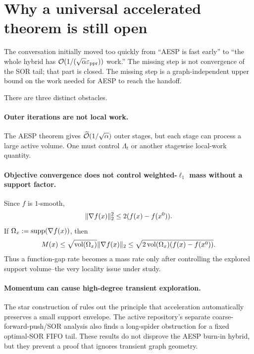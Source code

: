 \section{Why a universal accelerated theorem is still open}
\label{sec:open-gap}

The conversation initially moved too quickly from ``AESP is fast early'' to
``the whole hybrid has $\mathcal{O}(1/(\sqrt\alpha\varepsilon_{\mathrm{ppr}}))$ work.''  The missing step is
not convergence of the SOR tail; that part is closed.  The missing step is a
graph-independent upper bound on the work needed for AESP to reach the
handoff.

There are three distinct obstacles.

\paragraph{Outer iterations are not local work.}
The AESP theorem gives $\widetilde{\mathcal{O}}(1/\sqrt\alpha)$ outer stages, but each stage can
process a large active volume.  One must control $\Lambda_t$ or another
stagewise local-work quantity.

\paragraph{Objective convergence does not control weighted-$\ell_1$ mass
without a support factor.}
Since $f$ is $1$-smooth,
\begin{equation}
  \lVert\nabla f(x)\rVert_2^2\leq2(f(x)-f(x^0)).
  \label{eq:gradient-gap}
\end{equation}
If $\Omega_x:=\operatorname{supp}(\nabla f(x))$, then
\begin{equation}
  M(x)
  \leq\sqrt{\operatorname{vol}(\Omega_x)}\lVert\nabla f(x)\rVert_2
  \leq\sqrt{2\operatorname{vol}(\Omega_x)(f(x)-f(x^0))}.
  \label{eq:mass-gap-support}
\end{equation}
Thus a function-gap rate becomes a mass rate only after controlling the
explored support volume--the very locality issue under study.

\paragraph{Momentum can cause high-degree transient exploration.}
The star construction of \citet{fountoulakis2026complexity} rules out the
principle that acceleration automatically preserves a small support envelope.
The active repository's separate coarse-forward-push/SOR analysis also finds
a long-spider obstruction for a fixed optimal-SOR FIFO tail.  These results do
not disprove the AESP burn-in hybrid, but they prevent a proof that ignores
transient graph geometry.

